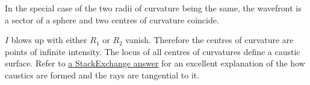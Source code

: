 \begin{enumerate}
In the special case of the two radii of curvature being the same, the wavefront
is a sector of a sphere and two centres of curvature coincide. 

$I$ blows up with either $R_1$ or $R_2$ vanish. Therefore the centres of curvature
are points of infinite intensity. The locus of all centres of curvatures define a
caustic surface. Refer to \href{https://physics.stackexchange.com/a/256561/10236}
{a StackExchange answer} for an excellent explanation of the how caustics are 
formed and the rays are tangential to it.
\end{enumerate}
